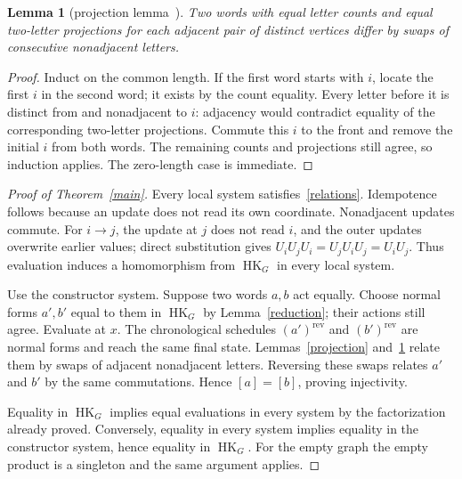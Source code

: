 \documentclass[11pt]{article}
\newtheorem{lemma}[theorem]{Lemma}
\newcommand{\HK}{\operatorname{HK}}
\begin{document}
\begin{lemma}[projection lemma~\cite{CP,Duboc}]\label{trace}
Two words with equal letter counts and equal two-letter projections for
each adjacent pair of distinct vertices differ by swaps of consecutive
nonadjacent letters.
\end{lemma}
\begin{proof}
Induct on the common length. If the first word starts with $i$, locate
the first $i$ in the second word; it exists by the count equality. Every
letter before it is distinct from and nonadjacent to $i$: adjacency would
contradict equality of the corresponding two-letter projections. Commute
this $i$ to the front and remove the initial $i$ from both words. The
remaining counts and projections still agree, so induction applies.
The zero-length case is immediate.
\end{proof}

\begin{proof}[Proof of Theorem~\ref{main}]
Every local system satisfies~\eqref{relations}. Idempotence follows
because an update does not read its own coordinate. Nonadjacent updates
commute. For $i\to j$, the update at $j$ does not read $i$, and the outer
updates overwrite earlier values; direct substitution gives
$U_iU_jU_i=U_jU_iU_j=U_iU_j$. Thus evaluation induces a homomorphism
from $\HK_G$ in every local system.

Use the constructor system. Suppose two words $a,b$ act equally. Choose
normal forms $a',b'$ equal to them in $\HK_G$ by Lemma~\ref{reduction};
their actions still agree. Evaluate at $x$. The chronological schedules
$(a')^{\mathrm{rev}}$ and $(b')^{\mathrm{rev}}$ are normal forms and reach
the same final state. Lemmas~\ref{projection} and~\ref{trace} relate them
by swaps of adjacent nonadjacent letters. Reversing these swaps relates
$a'$ and $b'$ by the same commutations. Hence $[a]=[b]$, proving
injectivity.

Equality in $\HK_G$ implies equal evaluations in every system by the
factorization already proved. Conversely, equality in every system implies
equality in the constructor system, hence equality in $\HK_G$. For the
empty graph the empty product is a singleton and the same argument applies.
\end{proof}
\end{document}
